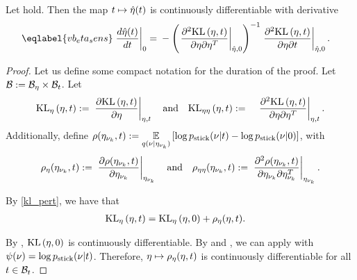 \begin{thm}
%
Let  hold.  Then the map $t \mapsto
\hat\eta(t)$ is continuously differentiable with derivative
%
\begin{align}\eqlabel{vb_eta_sens}
%
\fracat{d \etaopt(\t)}{d \t}{0} ={}&
    - \left( \fracat{\partial^2 \KL{\eta, \t}}
                    {\partial \eta \partial \eta^T}
                    {\etaopt, 0} \right)^{-1}
    \fracat{\partial^2 \KL{\eta, \t}}
           {\partial \eta \partial \t}
           {\etaopt, 0}.
%
\end{align}
%
%
\begin{proof}
%
Let us define some compact notation for the duration of the proof. Let $\mathcal{B} :=
\mathcal{B}_\eta \times \mathcal{B}_t$.  Let
%
\begin{align*}
%
\KLgrad{\eta, \t} :={}&
    \fracat{\partial \KL{\eta, \t}}{\partial \eta}{\eta, \t}
\mathtxt{and}
\KLhess{\eta, \t} :={}&
    \fracat{\partial^2 \KL{\eta, \t}}
           {\partial \eta \partial \eta^T}{\eta, \t}.
%
\end{align*}
%
Additionally, define $\rho(\eta_{\nu_{k}}, t) :={} \underset{q(\nu \vert \eta_{\nu_{k}})}{\mathbb{E}}\left[\log
p_{\mathrm{stick}}(\nu \vert t) - \log p_{\mathrm{stick}}(\nu \vert 0)\right]$, with
%
\begin{align*}
%
\rho_\eta(\etanuk, \t) :={}
\fracat{\partial \rho(\etanuk, \t)}
       {\partial \etanuk}{\etanuk} \mathand
\rho_{\eta\eta}(\etanuk, \t) :={}
   \fracat{\partial^2 \rho(\etanuk, \t)}
          {\partial \etanuk \partial \etanuk^T}{\etanuk}.
%
\end{align*}

By \eqref{kl_pert}, we have that
%
\begin{align*}
%
\KLgrad{\eta, \t} ={}& \KLgrad{\eta, 0} + \rho_\eta(\eta, \t).
%
\end{align*}

By , $\mathrm{KL}\left(\eta, 0\right)$ is continuously
differentiable. By  and
, we can apply
 with $\psi(\nu) = \log p_{\mathrm{stick}}(\nu \vert t)$.
Therefore, $\eta \mapsto \rho_\eta(\eta, t)$ is continuously differentiable for
all $t \in \mathcal{B}_t$.


\end{proof}
\end{thm}
